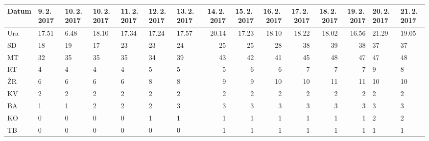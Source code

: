 \documentclass[12pt, a4paper, oneside]{report}
\begin{document}
\begin{table}
\begin{minipage}{\textwidth}
    \begin{tabular}{|HHHHHHHr|r|r|r|r|rHH|}
      \hline \hline
      Datum & 9.\,2.\,2017 & 10.\,2.\,2017 & 10.\,2.\,2017 & 11.\,2.\,2017 & 12.\,2.\,2017 & 13.\,2.\,2017 & 14.\,2.\,2017 & 15.\,2.\,2017 & 16.\,2.\,2017 & 17.\,2.\,2017 & 18.\,2.\,2017 & 19.\,2.\,2017 & 20.\,2.\,2017 & 21.\,2.\,2017 \\ \hline
      Ura & 17.51	& 6.48	& 18.10	& 17.34	& 17.24	& 17.57	& 20.14	& 17.23	& 18.10	& 18.22	& 18.02	& 16.56	& 21.29	& 19.05 \\ \hline \hline
      SD & 18 & 19 & 17 & 23 & 23 & 24 & 25 & 25 & 28 & 38 & 39 & 38 & 37 & 37 \\ \hline
      MT & 32 & 35 & 35 & 35 & 34 & 39 & 43 & 42 & 41 & 45 & 48 & 47 & 47 & 48 \\ \hline
      RT & 4 & 4 & 4 & 4 & 5 & 5 & 5 & 6 & 6 & 7 & 7 & 7 & 9 & 8 \\ \hline
      ŽR & 6 & 6 & 6 & 6 & 8 & 8 & 9 & 9 & 10 & 10 & 11 & 11 & 10 & 10 \\ \hline
      KV & 2 & 2 & 2 & 2 & 2 & 2 & 2 & 2 & 2 & 2 & 2 & 2 & 2 & 2 \\ \hline
      BA & 1 & 1 & 2 & 2 & 2 & 3 & 3 & 3 & 3 & 3 & 3 & 3 & 3 & 3 \\ \hline
      KO & 0 & 0 & 0 & 0 & 1 & 1 & 1 & 1 & 1 & 1 & 1 & 1 & 2 & 2 \\ \hline
      TB & 0 & 0 & 0 & 0 & 0 & 0 & 1 & 1 & 1 & 1 & 1 & 1 & 1 & 1 \\ \hline \hline
    \end{tabular}

    \vspace{0.3cm}


\end{minipage}
\end{table}
\end{document}
